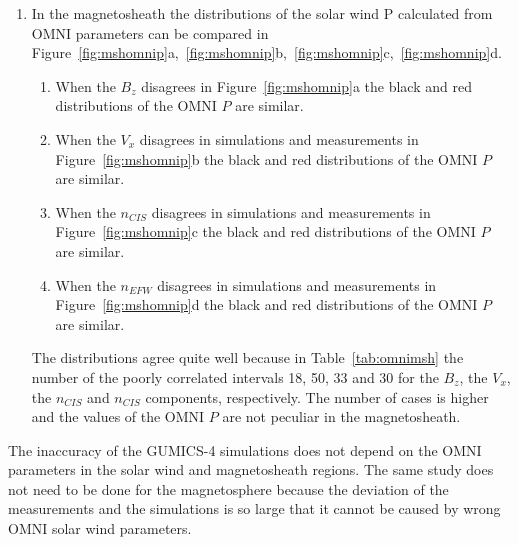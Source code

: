 \documentclass[draft]{agujournal2019}
\begin{document}
\begin{enumerate}
\item In the magnetosheath the distributions of the solar wind P calculated from OMNI parameters can be compared in Figure~\ref{fig:mshomnip}a,~\ref{fig:mshomnip}b,~\ref{fig:mshomnip}c,~\ref{fig:mshomnip}d.
\begin{enumerate}
\item When the $B_{z}$ disagrees in Figure~\ref{fig:mshomnip}a the black and red distributions of the OMNI $P$ are similar.

\item When the $V_{x}$ disagrees in simulations and measurements in Figure~\ref{fig:mshomnip}b the black and red distributions of the OMNI $P$ are similar.

\item When the $n_{CIS}$ disagrees in simulations and measurements in Figure~\ref{fig:mshomnip}c the black and red distributions of the OMNI $P$ are similar.

\item When the $n_{EFW}$ disagrees in simulations and measurements in Figure~\ref{fig:mshomnip}d the black and red distributions of the OMNI $P$ are similar.
\end{enumerate}
The distributions agree quite well because in Table~\ref{tab:omnimsh} the number of the poorly correlated intervals 18, 50, 33 and 30 for the $B_{z}$, the $V_{x}$, the $n_{CIS}$ and $n_{CIS}$ components, respectively. The number of cases is higher and the values of the OMNI $P$ are not peculiar in the magnetosheath.
\end{enumerate}
The inaccuracy of the GUMICS-4 simulations does not depend on the OMNI parameters in the solar wind and magnetosheath regions. The same study does not need to be done for the magnetosphere because the deviation of the measurements and the simulations is so large that it cannot be caused by wrong OMNI solar wind parameters.
\end{document}
